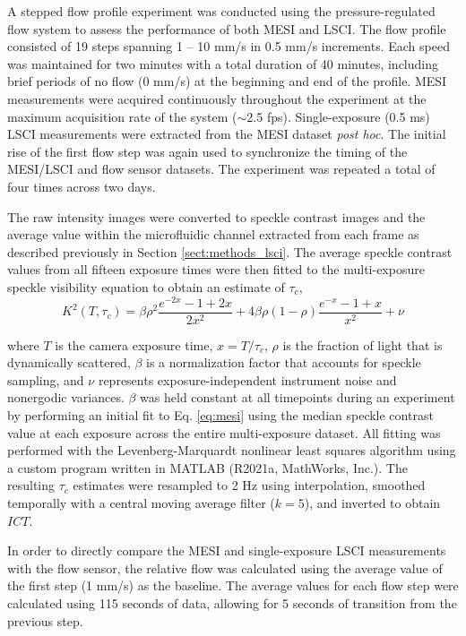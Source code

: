 \documentclass[12pt]{spieman}
\begin{document}
\begin{spacing}{2}
A stepped flow profile experiment was conducted using the pressure-regulated flow system to assess the performance of both MESI and LSCI. The flow profile consisted of 19 steps spanning 1 -- 10 mm/s in 0.5 mm/s increments. Each speed was maintained for two minutes with a total duration of 40 minutes, including brief periods of no flow (0 mm/s) at the beginning and end of the profile. MESI measurements were acquired continuously throughout the experiment at the maximum acquisition rate of the system ($\sim$2.5 fps). Single-exposure (0.5 ms) LSCI measurements were extracted from the MESI dataset \textit{post hoc}. The initial rise of the first flow step was again used to synchronize the timing of the MESI/LSCI and flow sensor datasets. The experiment was repeated a total of four times across two days.

The raw intensity images were converted to speckle contrast images and the average value within the microfluidic channel extracted from each frame as described previously in Section \ref{sect:methods_lsci}. The average speckle contrast values from all fifteen exposure times were then fitted to the multi-exposure speckle visibility equation \cite{Parthasarathy:2008el} to obtain an estimate of $\tau_c$,
%
\begin{equation}
    \label{eq:mesi}
    K^2(T,\tau_c) =
        \beta\rho^2\frac{e^{-2x} - 1 + 2x}{2x^2} +
        4\beta\rho(1 - \rho)\frac{e^{-x} - 1 + x}{x^2} +
        \nu
\end{equation}

\noindent where $T$ is the camera exposure time, $x=T/\tau_c$, $\rho$ is the fraction of light that is dynamically scattered, $\beta$ is a normalization factor that accounts for speckle sampling, and $\nu$ represents exposure-independent instrument noise and nonergodic variances. $\beta$ was held constant at all timepoints during an experiment by performing an initial fit to Eq. \ref{eq:mesi} using the median speckle contrast value at each exposure across the entire multi-exposure dataset. All fitting was performed with the Levenberg-Marquardt nonlinear least squares algorithm \cite{Lourakis:J2fCMU5i} using a custom program written in MATLAB (R2021a, MathWorks, Inc.). The resulting $\tau_c$ estimates were resampled to 2 Hz using interpolation, smoothed temporally with a central moving average filter ($k=5$), and inverted to obtain $ICT$.

In order to directly compare the MESI and single-exposure LSCI measurements with the flow sensor, the relative flow was calculated using the average value of the first step (1 mm/s) as the baseline. The average values for each flow step were calculated using 115 seconds of data, allowing for 5 seconds of transition from the previous step.



\end{spacing}
\end{document}
